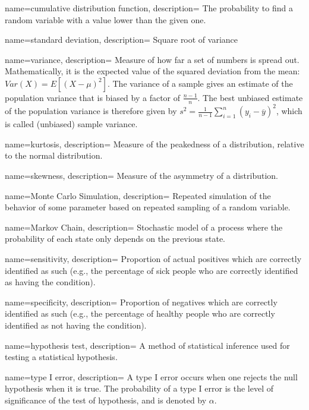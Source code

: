 {
    name=cumulative distribution function,
    description={ The probability to find a random variable with a value lower than the
    given one.}
}

{
    name=standard deviation,
    description={ Square root of variance}
}

{
    name=variance,
    description={ Measure of how far a set of numbers is spread out. Mathematically, it is
    the expected value of the squared deviation from the mean:
    $Var(X)=E[(X-\mu)^2]$. The variance of a sample gives an estimate of the
    population variance that is biased by a factor of $\frac{n-1}{n}$. The
    best unbiased estimate of the population variance is therefore given by
    $s^2 = \frac{1}{n-1} \sum_{i=1}^n \left(y_i - \overline{y} \right)^2$,
    which is called (unbiased) sample variance.}
}

{
    name=kurtosis,
    description={ Measure of the peakedness of a distribution, relative to the
    normal distribution.}
}

{
    name=skewness,
    description={ Measure of the asymmetry of a distribution.}
}

{
    name=Monte Carlo Simulation,
    description={ Repeated simulation of the behavior of some parameter based on repeated
    sampling of a random variable. }
}


{
    name=Markov Chain,
    description={ Stochastic model of a process where the probability of each state only
    depends on the previous state.}
}

{
    name=sensitivity,
    description={ Proportion of actual positives which are correctly identified as such
    (e.g., the percentage of sick people who are correctly identified as
    having the condition).}
}

{
    name=specificity,
    description={ Proportion of negatives which are correctly identified as such (e.g.,
     the percentage of healthy people who are correctly identified as not
     having the condition).}
}

{
    name=hypothesis test,
    description={ A method of statistical inference used for testing a statistical
    hypothesis.}
}

{
    name=type I error,
    description={ A type I error occurs when one rejects the null hypothesis when it is
    true. The probability of a type I error is the level of significance of
    the test of hypothesis, and is denoted by $\alpha$.}
}

